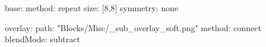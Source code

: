 base:
  method: repeat
  size: [8,8]
  symmetry: none

overlay:
  path: "Blocks/Misc/_sub_overlay_soft.png"
  method: connect
blendMode: subtract